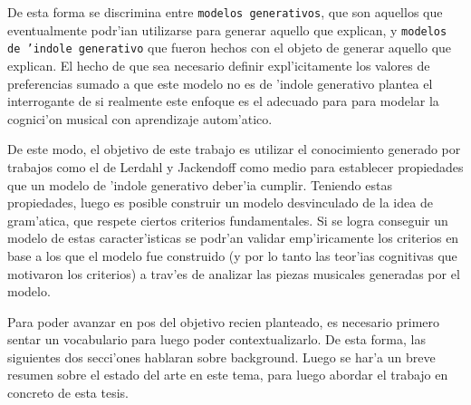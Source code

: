 De esta forma se discrimina entre \texttt{modelos generativos}, que son aquellos que eventualmente podr'ian utilizarse para generar aquello que explican, y 
\texttt{modelos de 'indole generativo} que fueron hechos con el objeto de generar aquello que explican.  El hecho de que sea necesario definir expl'icitamente los valores de preferencias
sumado a que este modelo no es de 'indole generativo plantea el interrogante de si realmente este enfoque es el adecuado para para modelar la cognici'on musical con aprendizaje 
autom'atico. 

De este modo, el objetivo de este trabajo es utilizar el conocimiento generado por trabajos como el de Lerdahl y Jackendoff como medio para establecer propiedades que un modelo de 
'indole generativo deber'ia cumplir. Teniendo estas propiedades, luego es posible construir un modelo desvinculado de la idea de gram'atica, que respete 
ciertos criterios fundamentales. Si se logra conseguir un modelo de estas caracter'isticas se podr'an validar emp'iricamente los criterios en base a los que el modelo fue construido 
(y por lo tanto las teor'ias cognitivas que motivaron los criterios) a trav'es de analizar las piezas musicales generadas por el modelo.

Para poder avanzar en pos del objetivo recien planteado, es necesario primero sentar un vocabulario para luego poder contextualizarlo. De esta forma, las siguientes dos
secci'ones hablaran sobre background. Luego se har'a un breve resumen sobre el estado del arte en este tema, para luego abordar el trabajo en concreto de esta tesis.

